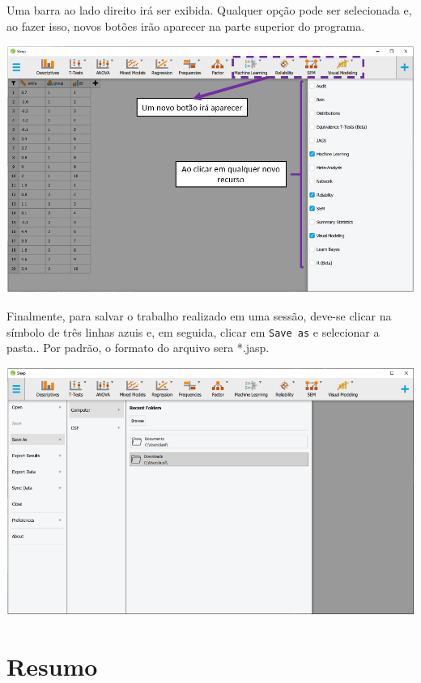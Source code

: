 \documentclass[
]{book}
\begin{document}
Uma barra ao lado direito irá ser exibida. Qualquer opção pode ser selecionada e, ao fazer isso, novos botões irão aparecer na parte superior do programa.

\includegraphics{./img/cap_jasp_adicionar_modulos2.png}

Finalmente, para salvar o trabalho realizado em uma sessão, deve-se clicar na símbolo de três linhas azuis e, em seguida, clicar em \texttt{Save\ as} e selecionar a pasta.. Por padrão, o formato do arquivo sera *.jasp.

\includegraphics{./img/cap_jasp_salvar.png}

\hypertarget{resumo}{%
\section{Resumo}\label{resumo}}
\end{document}
